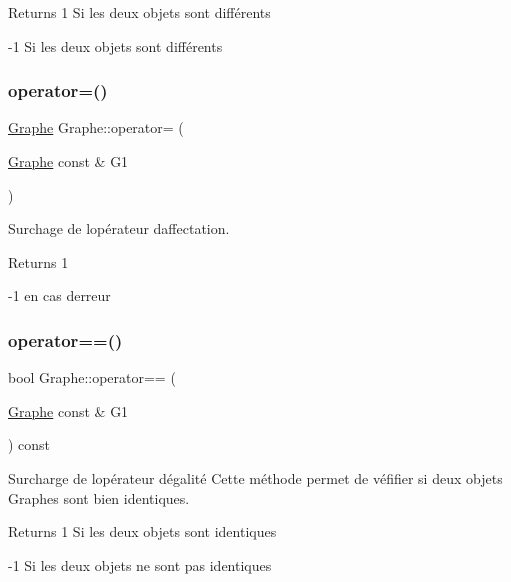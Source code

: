 \begin{DoxyReturn}{Returns}
1 Si les deux objets sont diff\'{e}rents 

-\/1 Si les deux objets sont diff\'{e}rents 
\end{DoxyReturn}
\mbox{\label{classGraphe_ae72a0836b560b51da3d82d3d4ff3a7c0}} 
\subsubsection{\texorpdfstring{operator=()}{operator=()}}
{\footnotesize\ttfamily \hyperlink{classGraphe}{Graphe} Graphe\+::operator= (\begin{DoxyParamCaption}\item[{\hyperlink{classGraphe}{Graphe} const \&}]{G1 }\end{DoxyParamCaption})}



Surchage de l\textquotesingle{}op\'{e}rateur d\textquotesingle{}affectation. 

\begin{DoxyReturn}{Returns}
1 

-\/1 en cas d\textquotesingle{}erreur 
\end{DoxyReturn}
\mbox{\label{classGraphe_af1333b4eb62b330dd004764342622e52}} 
\subsubsection{\texorpdfstring{operator==()}{operator==()}}
{\footnotesize\ttfamily bool Graphe\+::operator== (\begin{DoxyParamCaption}\item[{\hyperlink{classGraphe}{Graphe} const \&}]{G1 }\end{DoxyParamCaption}) const}



Surcharge de l\textquotesingle{}op\'{e}rateur d\textquotesingle{}\'{e}galit\'{e} Cette m\'{e}thode permet de v\'{e}fifier si deux objets Graphes sont bien identiques. 

\begin{DoxyReturn}{Returns}
1 Si les deux objets sont identiques 

-\/1 Si les deux objets ne sont pas identiques 
\end{DoxyReturn}
\mbox{\label{classGraphe_ae547f8dcd9f8e4c23b314a26cc04de06}} 
